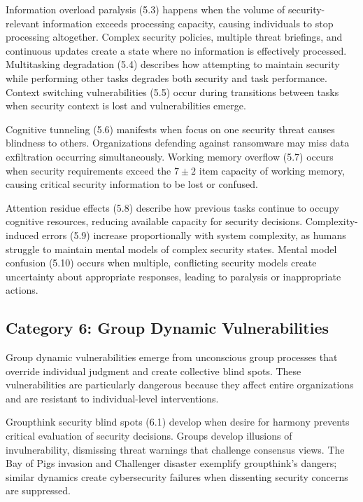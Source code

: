 \documentclass[11pt,a4paper]{article}
\begin{document}
Information overload paralysis (5.3) happens when the volume of security-relevant information exceeds processing capacity, causing individuals to stop processing altogether. Complex security policies, multiple threat briefings, and continuous updates create a state where no information is effectively processed. Multitasking degradation (5.4) describes how attempting to maintain security while performing other tasks degrades both security and task performance. Context switching vulnerabilities (5.5) occur during transitions between tasks when security context is lost and vulnerabilities emerge.

Cognitive tunneling (5.6) manifests when focus on one security threat causes blindness to others. Organizations defending against ransomware may miss data exfiltration occurring simultaneously. Working memory overflow (5.7) occurs when security requirements exceed the $7\pm2$ item capacity of working memory, causing critical security information to be lost or confused.

Attention residue effects (5.8) describe how previous tasks continue to occupy cognitive resources, reducing available capacity for security decisions. Complexity-induced errors (5.9) increase proportionally with system complexity, as humans struggle to maintain mental models of complex security states. Mental model confusion (5.10) occurs when multiple, conflicting security models create uncertainty about appropriate responses, leading to paralysis or inappropriate actions.

\subsection{Category 6: Group Dynamic Vulnerabilities}

Group dynamic vulnerabilities emerge from unconscious group processes that override individual judgment and create collective blind spots. These vulnerabilities are particularly dangerous because they affect entire organizations and are resistant to individual-level interventions.

Groupthink security blind spots (6.1) develop when desire for harmony prevents critical evaluation of security decisions. Groups develop illusions of invulnerability, dismissing threat warnings that challenge consensus views. The Bay of Pigs invasion and Challenger disaster exemplify groupthink's dangers; similar dynamics create cybersecurity failures when dissenting security concerns are suppressed.
\end{document}
